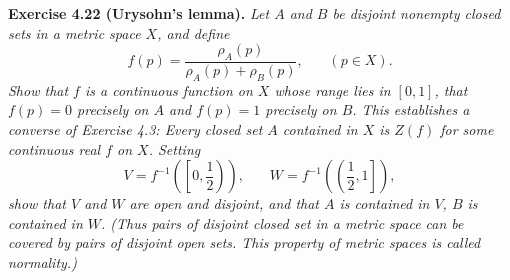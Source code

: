 \documentclass{article}
\begin{document}



\textbf{Exercise 4.22 (Urysohn's lemma).}
\emph{Let $A$ and $B$ be disjoint nonempty closed sets in a metric space $X$,
and define
\[
  f(p) = \frac{\rho_A(p)}{\rho_A(p)+\rho_B(p)}, \:\:\:\:\:\:\:\: (p \in X).
\]
Show that $f$ is a continuous function on $X$ whose range lies in $[0,1]$,
that $f(p) = 0$ precisely on $A$ and $f(p) = 1$ precisely on $B$.
This establishes a converse of Exercise 4.3:
Every closed set $A$ contained in $X$ is $Z(f)$ for some continuous real $f$ on $X$.
Setting
\[
  V = f^{-1}{\left(\left[0,\frac{1}{2}\right)\right)},
  \:\:\:\:\:\:\:\:
  W = f^{-1}{\left(\left(\frac{1}{2},1\right]\right)},
\]
show that $V$ and $W$ are open and disjoint,
and that $A$ is contained in $V$, $B$ is contained in $W$.
(Thus pairs of disjoint closed set in a metric space can be covered by pairs of disjoint open sets.
This property of metric spaces is called normality.)} \\
\end{document}

